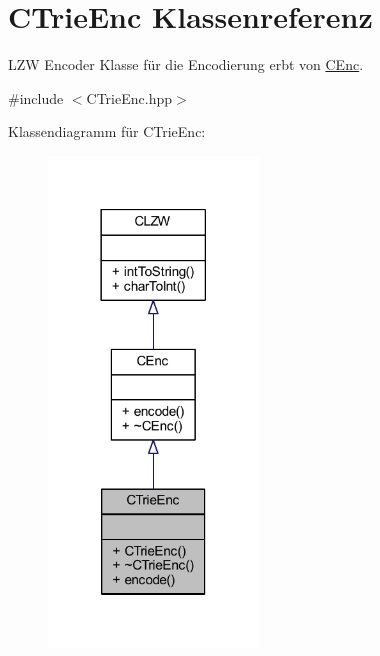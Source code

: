 \hypertarget{class_c_trie_enc}{}\section{C\+Trie\+Enc Klassenreferenz}
\label{class_c_trie_enc}


L\+ZW Encoder Klasse für die Encodierung erbt von \hyperlink{class_c_enc}{C\+Enc}.  




{\ttfamily \#include $<$C\+Trie\+Enc.\+hpp$>$}



Klassendiagramm für C\+Trie\+Enc\+:
\nopagebreak
\begin{figure}[H]
\begin{center}
\leavevmode
\includegraphics[width=158pt]{class_c_trie_enc__inherit__graph}
\end{center}
\end{figure}


